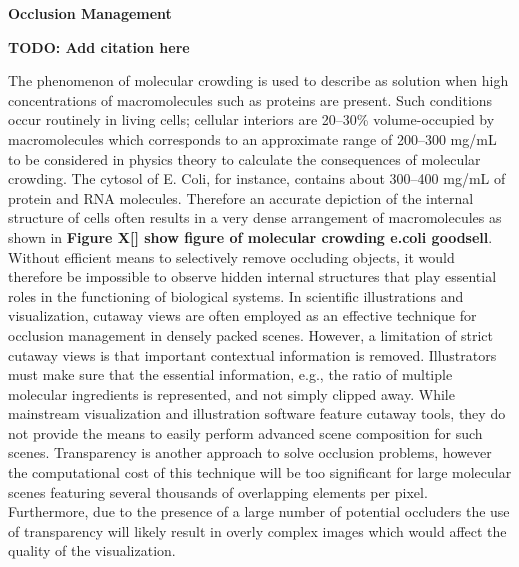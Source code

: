 \textbf{Occlusion Management}

%

\textbf{TODO: Add citation here}

The phenomenon of molecular crowding is used to describe as solution when high concentrations of macromolecules such as proteins are present.
Such conditions occur routinely in living cells; cellular interiors are 20–30\% volume-occupied by macromolecules which corresponds to an approximate range of 200–300 mg/mL to be considered in physics theory to calculate the consequences of molecular crowding.
The cytosol of E. Coli, for instance, contains about 300–400 mg/mL of protein and RNA molecules.
Therefore an accurate depiction of the internal structure of cells often results in a very dense arrangement of macromolecules as shown in \textbf{Figure X[] show figure of molecular crowding e.coli goodsell}.
Without efficient means to selectively remove occluding objects, it would therefore be impossible to observe hidden internal structures that play essential roles in the functioning of biological systems.
In scientific illustrations and visualization, cutaway views are often employed as an effective technique for occlusion management in densely packed scenes.
However, a limitation of strict cutaway views is that important contextual information is removed.
Illustrators must make sure that the essential information, e.g., the ratio of multiple molecular ingredients is represented, and not simply clipped away.
While mainstream visualization and illustration software feature cutaway tools, they do not provide the means to easily perform advanced scene composition for such scenes.
Transparency is another approach to solve occlusion problems, however the computational cost of this technique will be too significant for large molecular scenes featuring several thousands of overlapping elements per pixel.
Furthermore, due to the presence of a large number of potential occluders the use of transparency will likely result in overly complex images which would affect the quality of the visualization.

